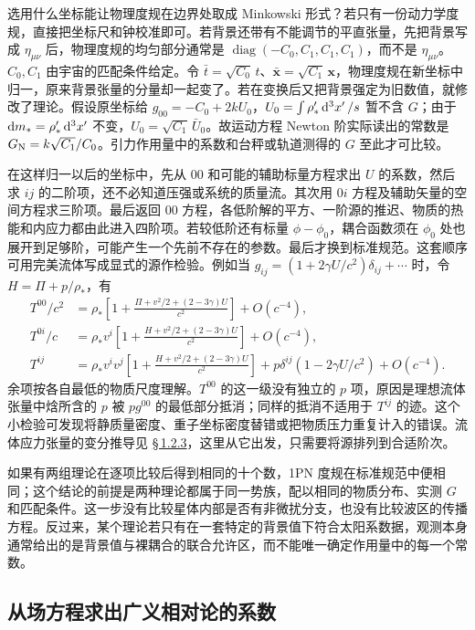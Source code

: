 选用什么坐标能让物理度规在边界处取成 Minkowski 形式？若只有一份动力学度规，直接把坐标尺和钟校准即可。若背景还带有不能调节的平直张量，先把背景写成 $\eta_{\mu\nu}$ 后，物理度规的均匀部分通常是 $\operatorname{diag}(-C_0,C_1,C_1,C_1)$，而不是 $\eta_{\mu\nu}$。$C_0,C_1$ 由宇宙的匹配条件给定。令 $\bar t=\sqrt{C_0}\,t$、$\bar{\bm x}=\sqrt{C_1}\,\bm x$，物理度规在新坐标中归一，原来背景张量的分量却一起变了。若在变换后又把背景强定为旧数值，就修改了理论。假设原坐标给 $g_{00}=-C_0+2kU_0$，$U_0=\int\rho_*'\dd[3]{x'}/s$ 暂不含 $G$；由于 $\dd m_*=\rho_*'\dd[3]{x'}$ 不变，$U_0=\sqrt{C_1}\,\bar U_0$。故运动方程 Newton 阶实际读出的常数是 $G_{\rm N}=k\sqrt{C_1}/C_0$。引力作用量中的系数和台秤或轨道测得的 $G$ 至此才可比较。

在这样归一以后的坐标中，先从 $00$ 和可能的辅助标量方程求出 $U$ 的系数，然后求 $ij$ 的二阶项，还不必知道压强或系统的质量流。其次用 $0i$ 方程及辅助矢量的空间方程求三阶项。最后返回 $00$ 方程，各低阶解的平方、一阶源的推迟、物质的热能和内应力都由此进入四阶项。若较低阶还有标量 $\phi-\phi_0$，耦合函数须在 $\phi_0$ 处也展开到足够阶，可能产生一个先前不存在的参数。最后才换到标准规范。这套顺序可用完美流体写成显式的源作检验。例如当 $g_{ij}=(1+2\gamma U/c^2)\delta_{ij}+\cdots$ 时，令 $H=\Pi+p/\rho_*$，有
\begin{align*}
 T^{00}/c^2&=\rho_*\!\left[1+\frac{\Pi+v^2/2+(2-3\gamma)U}{c^2}\right]+O(c^{-4}),\\
 T^{0i}/c&=\rho_*v^i\!\left[1+\frac{H+v^2/2+(2-3\gamma)U}{c^2}\right]+O(c^{-4}),\\
 T^{ij}&=\rho_*v^iv^j\!\left[1+\frac{H+v^2/2+(2-3\gamma)U}{c^2}\right]
          +p\delta^{ij}(1-2\gamma U/c^2)+O(c^{-4}).
\end{align*}
余项按各自最低的物质尺度理解。$T^{00}$ 的这一级没有独立的 $p$ 项，原因是理想流体张量中焓所含的 $p$ 被 $pg^{00}$ 的最低部分抵消；同样的抵消不适用于 $T^{ij}$ 的迹。这个小检验可发现将静质量密度、重子坐标密度替错或把物质压力重复计入的错误。流体应力张量的变分推导见 \hyperlink{subsection.1.2.3}{\S\,1.2.3}，这里从它出发，只需要将源排列到合适阶次。

如果有两组理论在逐项比较后得到相同的十个数，1PN 度规在标准规范中便相同；这个结论的前提是两种理论都属于同一势族，配以相同的物质分布、实测 $G$ 和匹配条件。这一步没有比较星体内部是否有非微扰分支，也没有比较波区的传播方程。反过来，某个理论若只有在一套特定的背景值下符合太阳系数据，观测本身通常给出的是背景值与裸耦合的联合允许区，而不能唯一确定作用量中的每一个常数。

\subsection{从场方程求出广义相对论的系数}

